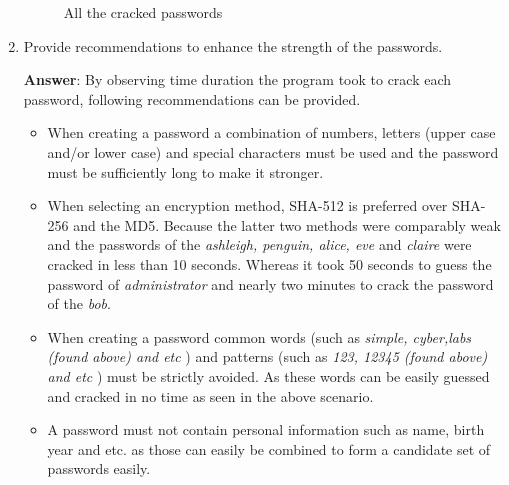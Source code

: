 \documentclass[11pt,letterpaper]{article}
\begin{document}
\begin{enumerate}
		\begin{figure}[H]
			\centering
			\caption{All the cracked passwords}
		\end{figure}
		\pagebreak
		\item Provide recommendations to enhance the strength of the passwords.
		
		\textbf{\Large Answer}: By observing time duration the program took to crack each password, following recommendations can be provided.
		
		\begin{itemize}
			\item When creating a password a combination of numbers, letters (upper case and/or lower case)  and special characters must be used and the password must be sufficiently long to make it stronger.
			
			\item When selecting an encryption method, SHA-512 is preferred over SHA-256 and the MD5. Because the latter two methods were comparably weak and the passwords of the \textit{ashleigh, penguin, alice, eve} and \textit{claire} were cracked in less than 10 seconds. Whereas it took 50 seconds to guess the password of \textit{administrator} and nearly two minutes to crack the password of the \textit{bob}.
			
			\item When creating a password common words (such as \textit{simple, cyber,labs (found above)  and etc} ) and patterns (such as \textit{123, 12345 (found above) and etc} ) must be strictly avoided. As these words can be easily guessed and cracked in no time as seen in the above scenario.					
			
			\item A password must not contain personal information such as name, birth year and etc. as those can easily be combined to form a candidate set of passwords easily.
		\end{itemize}
		
		
		
		\clearpage
		
	\end{enumerate}    
	
\end{document}

